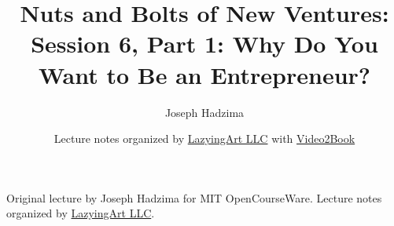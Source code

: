 \documentclass[11pt,oneside]{book}
\begin{document}
\frontmatter
\title{Nuts and Bolts of New Ventures: Session 6, Part 1: Why Do You Want to Be an Entrepreneur?}
\author{Joseph Hadzima}
\date{Lecture notes organized by \href{https://lazying.art}{LazyingArt LLC} with \href{https://github.com/lachlanchen/Video2Book}{Video2Book}}
\maketitle
\begin{center}
\small Original lecture by Joseph Hadzima for MIT OpenCourseWare. Lecture notes organized by \href{https://lazying.art}{LazyingArt LLC}.
\end{center}
\clearpage
\mainmatter

\end{document}
